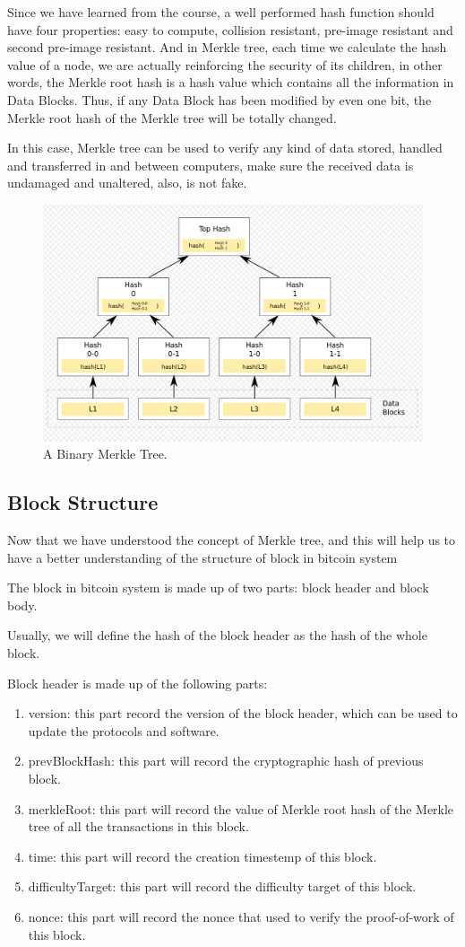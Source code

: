 \documentclass[12pt,a4paper]{article}
\begin{document}
Since we have learned from the course, a well performed hash function should have four properties: easy to compute, collision resistant, pre-image resistant and second pre-image resistant. And in Merkle tree, each time we calculate the hash value of a node, we are actually reinforcing the security of its children, in other words, the Merkle root hash is a hash value which contains all the information in Data Blocks. Thus, if any Data Block has been modified by even one bit, the Merkle root hash of the Merkle tree will be totally changed.

In this case, Merkle tree can be used to verify any kind of data stored, handled and transferred in and between computers, make sure the received data is undamaged and unaltered, also, is not fake.

\begin{figure}[htbp!]
	\centering
	\includegraphics[width=0.7\linewidth]{hash_tree.png}
	\caption{A Binary Merkle Tree.\cite{4}}
	\label{fig::diagram}
\end{figure}

\subsection{Block Structure}
Now that we have understood the concept of Merkle tree, and this will help us to have a better understanding of the structure of block in bitcoin system

The block in bitcoin system is made up of two parts: block header and block body.

Usually, we will define the hash of the block header as the hash of the whole block.

Block header is made up of the following parts:
\begin{enumerate}
    \item 
    version: this part record the version of the block header, which can be used to update the protocols and software.
    \item
    prevBlockHash: this part will record the cryptographic hash of previous block.
    \item
    merkleRoot: this part will record the value of Merkle root hash of the Merkle tree of all the transactions in this block.
    \item
    time: this part will record the creation timestemp of this block.
    \item
    difficultyTarget: this part will record the difficulty target of this block.
    \item
    nonce: this part will record the nonce that used to verify the proof-of-work of this block.
\end{enumerate}
\end{document}
